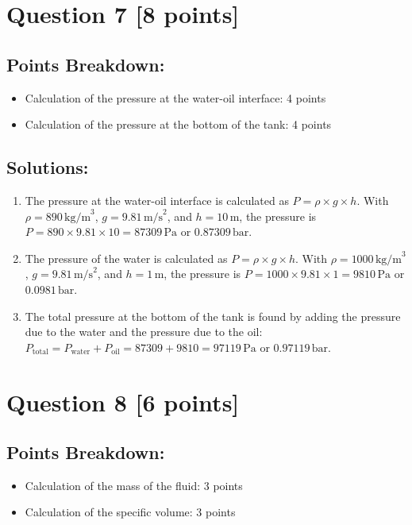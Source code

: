 \documentclass[12pt]{article}
\begin{document}
\newpage
\section*{Question 7 [8 points]}
\subsection*{Points Breakdown:}
\begin{itemize}
    \item Calculation of the pressure at the water-oil interface: 4 points
    \item Calculation of the pressure at the bottom of the tank: 4 points
\end{itemize}

\subsection*{Solutions:}
\begin{enumerate}
    \item The pressure at the water-oil interface is calculated as \( P = \rho \times g \times h \). With \( \rho = 890 \, \text{kg/m}^3 \), \( g = 9.81 \, \text{m/s}^2 \), and \( h = 10 \, \text{m} \), the pressure is \( P = 890 \times 9.81 \times 10 = 87309 \, \text{Pa} \) or \( 0.87309 \, \text{bar} \).
    \item The pressure of the water is calculated as \( P = \rho \times g \times h \). With \( \rho = 1000 \, \text{kg/m}^3 \), \( g = 9.81 \, \text{m/s}^2 \), and \( h = 1 \, \text{m} \), the pressure is \( P = 1000 \times 9.81 \times 1 = 9810 \, \text{Pa} \) or \( 0.0981 \, \text{bar} \).
    \item The total pressure at the bottom of the tank is found by adding the pressure due to the water and the pressure due to the oil: \( P_{\text{total}} = P_{\text{water}} + P_{\text{oil}} = 87309 + 9810 = 97119 \, \text{Pa} \) or \( 0.97119 \, \text{bar} \).
\end{enumerate}

\newpage
\section*{Question 8 [6 points]}
\subsection*{Points Breakdown:}
\begin{itemize}
    \item Calculation of the mass of the fluid: 3 points
    \item Calculation of the specific volume: 3 points
\end{itemize}
\end{document}

